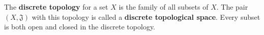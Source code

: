 The \textbf{discrete topology} for a set $X$ is the family of all subsets of $X$. The pair $(X, \mathfrak{J})$ with this topology is called a \textbf{discrete topological space}. Every subset is both open and closed in the discrete topology.
